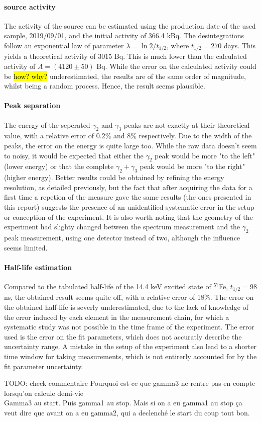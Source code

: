 \paragraph{\cobalt source activity}
The activity of the source can be estimated using the production date of the used sample, 2019/09/01, and the initial activity of 366.4 kBq. The desintegrations follow an exponential law of parameter \(\lambda = \ln 2 / t_{1/2}\), where \(t_{1/2} = 270\) days. This yields a theoretical activity of \(3015\) Bq. This is much lower than the calculated activity of \(A = (4120 \pm 50)\) Bq. While the error on the calculated activity could be \hl{how? why?} underestimated, the results are of the same order of magnitude, whilst being a random process. Hence, the result seems plausible.

\paragraph{Peak separation}
The energy of the seperated \(\gamma_2\) and \(\gamma_3\) peaks are not exactly at their theoretical value, with a relative error of \(0.2\%\) and \(8\%\) respectively. 
Due to the width of the peaks, the error on the energy is quite large too. 
While the raw data doesn't seem to noisy, it would be expected that either the \(\gamma_2\) peak would be more "to the left" (lower energy) or that the complete \(\gamma_2+\gamma_3\) peak would be more "to the right" (higher energy). 
Better results could be obtained by refining the energy resolution, as detailed previously, but the fact that after acquiring the data for a first time a repetion of the measure gave the same results (the ones presented in this report) suggests the presence of an unidentified systematic error in the setup or conception of the experiment. 
It is also worth noting that the geometry of the experiment had slighty changed between the spectrum measurement and the \(\gamma_2\) peak measurement, using one detector instead of two, although the influence seems limited.

\paragraph{Half-life estimation}
Compared to the tabulated half-life of the 14.4 keV excited state of $^{57}$Fe, \(t_{1/2} = 98\) ns, the obtained result seems quite off, with a relative error of 18\%. The error on the obtained half-life is severly underestimated, due to the lack of knowledge of the error induced by each element in the measurement chain, for which a systematic study was not possible in the time frame of the experiment. The error used is the error on the fit parameters, which does not accuratly describe the uncertainty range. A mistake in the setup of the experiment also lead to a shorter time window for taking measurements, which is not entirerly accounted for by the fit parameter uncertainty.

TODO: check commentaire
Pourquoi est-ce que gamma3 ne rentre pas en compte lorsqu'on calcule demi-vie \\
Gamma3 au start. Puis gamma1 au stop. Mais si on a eu gamma1 au stop ça veut dire que avant on a eu gamma2, qui a declenché le start du coup tout bon.

